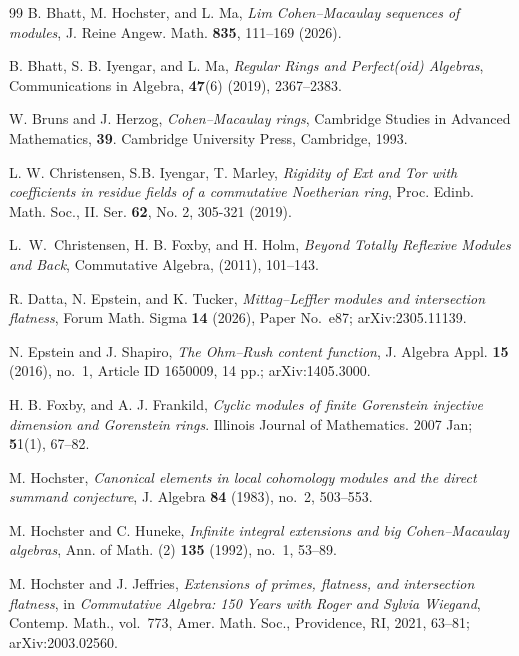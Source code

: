 \documentclass[12pt,reqno]{amsart}
\theoremstyle{definition}
\theoremstyle{remark}
\theoremstyle{cited}
\theoremstyle{remark}
\theoremstyle{citeddef}
\begin{document}
\begin{thebibliography}{99}
		B. Bhatt, M. Hochster, and L. Ma,
		\emph{Lim Cohen--Macaulay sequences of modules},
		J. Reine Angew. Math. {\bf835}, 111--169 (2026).
		
		B. Bhatt, S. B. Iyengar, and L. Ma, \emph{Regular Rings and Perfect(oid) Algebras}, Communications in Algebra, \textbf{47}(6) (2019), 2367--2383.
		
		W. Bruns and J. Herzog, \emph{Cohen--Macaulay rings}, Cambridge
		Studies in Advanced Mathematics,  {\bf39}. Cambridge University Press,
		Cambridge, 1993.
		
		 L. W. Christensen, S.B. Iyengar, T. Marley,  
		\emph{Rigidity of Ext and Tor with coefficients in residue fields of a commutative Noetherian ring},
		Proc. Edinb. Math. Soc., II. Ser. {\bf 62}, No. 2, 305-321 (2019).
		
		L.~W.~Christensen,  {H. B. Foxby}, and  {H. Holm}, 
		\emph{Beyond Totally Reflexive Modules and Back},  {Commutative Algebra}, ({2011}),  {{101}--{143}}.
		
		R. Datta, N. Epstein, and K. Tucker,
		\emph{Mittag--Leffler modules and intersection flatness},
		Forum Math. Sigma \textbf{14} (2026), Paper No.~e87;
		arXiv:2305.11139.
		
		N. Epstein and J. Shapiro,
		\emph{The Ohm--Rush content function},
		J. Algebra Appl. \textbf{15} (2016), no.~1,
		Article ID 1650009, 14 pp.;
		arXiv:1405.3000.
		
		H. B. Foxby, and A. J. Frankild, \emph{Cyclic modules of finite Gorenstein injective dimension and Gorenstein rings}. Illinois Journal of Mathematics. 2007 Jan; {\bf5}1(1), 67--82.
		
		M. Hochster,
		\emph{Canonical elements in local cohomology modules and the direct
			summand conjecture},
		J. Algebra \textbf{84} (1983), no.~2, 503--553.
		
		M. Hochster and C. Huneke,
		\emph{Infinite integral extensions and big Cohen--Macaulay algebras},
		Ann. of Math. (2) \textbf{135} (1992), no.~1, 53--89.
		
		M. Hochster and J. Jeffries,
		\emph{Extensions of primes, flatness, and intersection flatness},
		in \emph{Commutative Algebra: 150 Years with Roger and Sylvia Wiegand},
		Contemp. Math., vol.~773,
		Amer. Math. Soc., Providence, RI, 2021, 63--81;
		arXiv:2003.02560.
		

\end{thebibliography}
\end{document}
